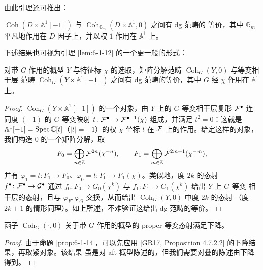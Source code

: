 
由此引理还可推出：

\begin{corollary}\label{cor:6-1-13}
$\operatorname{Coh}(D\times\mathbb A^1[-1])$ 与 $\operatorname{Coh}_{\mathbb G_m}(D\times\mathbb A^1,0)$ 之间有 dg 范畴的
等价，其中 $\mathbb G_m$ 平凡地作用在 $D$ 因子上，并以权 $1$ 作用在 $\mathbb A^1$ 上。
\end{corollary}

下述结果也可视为引理 \ref{lem:6-1-12} 的一个更一般的形式：

\begin{proposition}\label{prop:6-1-14}
对带 $G$ 作用的概型 $Y$ 与特征标 $\chi$ 的选取，矩阵分解范畴 $\operatorname{Coh}_G(Y,0)$ 与等变相干层
范畴 $\operatorname{Coh}_G(Y\times\mathbb A^1[-1])$ 之间有 dg 范畴的等价，其中 $G$ 经 $\chi$ 作用在
$\mathbb A^1$ 上。
\end{proposition}

\begin{proof}
$\operatorname{Coh}_G(Y\times\mathbb A^1[-1])$ 的一个对象，由 $Y$ 上的 $G$-等变相干层复形 $\mathcal{F}^\bullet$
连同度 $(-1)$ 的 $G$-等变映射 $t\colon\mathcal{F}^\bullet\to\mathcal{F}^{\bullet-1}(\chi)$ 组成，并满足
$t^2=0$：这就是 $\mathbb A^1[-1]=\operatorname{Spec}\mathbb{C}[t]$（$|t|=-1$）的权 $\chi$ 坐标
$t$ 在 $\mathcal{F}$ 上的作用。给定这样的对象，我们构造 $0$ 的一个矩阵分解，取
\[
F_0=\bigoplus_{n\in\mathbb{Z}}\mathcal{F}^{2n}(\chi^{-n}),\qquad
F_1=\bigoplus_{m\in\mathbb{Z}}\mathcal{F}^{2m+1}(\chi^{-m}),
\]
并有 $\varphi_1=t\colon F_1\to F_0$、$\varphi_0=t\colon F_0\to F_1(\chi)$。类似地，度
$2k$ 的态射 $f^\bullet\colon\mathcal{F}^\bullet\to\mathcal{G}^\bullet$ 通过
$f_0\colon F_0\to G_0(\chi^k)$ 与 $f_1\colon F_1\to G_1(\chi^k)$ 给出 $Y$ 上 $G$-等变
相干层的态射，且与 $\varphi_F,\varphi_G$ 交换，从而给出 $\operatorname{Coh}_G(Y,0)$ 中度 $2k$ 的态射
（度 $2k+1$ 的情形同理）。如上所述，不难验证这给出 dg 范畴的等价。
\end{proof}

\begin{proposition}\label{prop:6-1-15}
函子 $\operatorname{Coh}_G(\cdot,0)$ 关于带 $G$ 作用的概型的 proper 等变态射满足下降。
\end{proposition}

\begin{proof}
由于命题 \ref{prop:6-1-14}，可以先应用 [GR17, Proposition 4.7.2.2] 的下降结果，再取紧对象。该结果
虽是对 aft 概型陈述的，但我们需要对叠的陈述由下降得到。
\end{proof}


